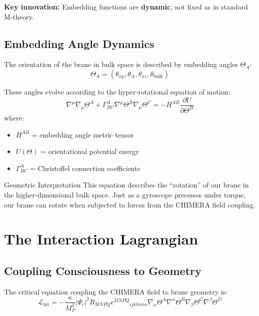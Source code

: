 \textbf{Key innovation:} Embedding functions are \textbf{dynamic}, not fixed as in standard M-theory.

\subsection{Embedding Angle Dynamics}

The orientation of the brane in bulk space is described by embedding angles $\Theta_A$:
\begin{equation}
\Theta_A = (\theta_{xy}, \theta_{zt}, \theta_{xz}, \theta_{\text{bulk}})
\end{equation}

These angles evolve according to the hyper-rotational equation of motion:
\begin{equation}
\nabla^\mu\nabla_\mu\Theta^A + \Gamma^A_{BC}\nabla^\mu\Theta^B\nabla_\mu\Theta^C = -H^{AB}\frac{\partial U}{\partial\Theta^B}
\end{equation}
where:
\begin{itemize}
\item $H^{AB}$ = embedding angle metric tensor
\item $U(\Theta)$ = orientational potential energy
\item $\Gamma^A_{BC}$ = Christoffel connection coefficients
\end{itemize}

\begin{calloutbox}{Geometric Interpretation}
This equation describes the ``rotation'' of our brane in the higher-dimensional bulk space. Just as a gyroscope precesses under torque, our brane can rotate when subjected to forces from the CHIMERA field coupling.
\end{calloutbox}

\section{The Interaction Lagrangian}

\subsection{Coupling Consciousness to Geometry}

The critical equation coupling the CHIMERA field to brane geometry is:
\begin{equation}
\mathcal{L}_{\text{int}} = -\frac{\kappa}{M_P^2}|\Psi_c|^2 R_{MNPQ}\epsilon^{MNPQ}{}_{ijklmno}\nabla_\alpha\Theta^A\nabla^\alpha\Theta^B\nabla_\beta\Theta^C\nabla^\beta\Theta^D
\end{equation}

